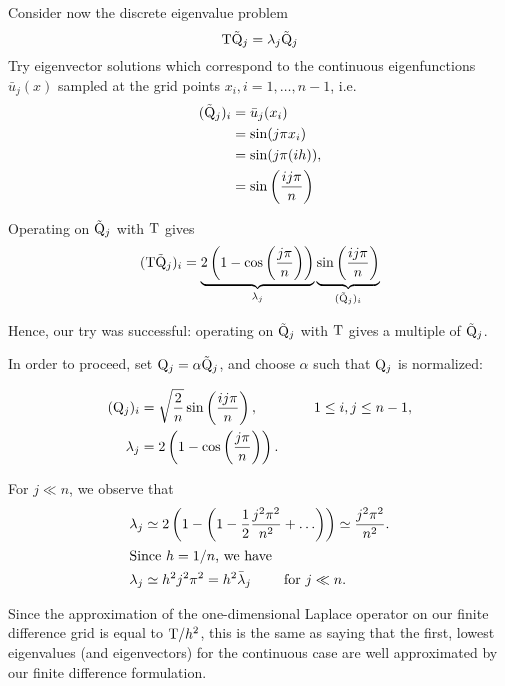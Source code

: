 Consider now the discrete eigenvalue problem
\begin{equation*}
  {\mathrm T} \tilde{{\mathrm Q}}_j =
  \lambda_j \tilde{{\mathrm Q}}_j
\end{equation*}
Try eigenvector solutions which correspond to the continuous eigenfunctions
$\bar{u}_j(x)$ sampled at the grid points $x_i, i=1,\ldots,n-1$, i.e.
\begin{equation*}
  \begin{split}
    (\tilde{{\mathrm Q}}_j)_i &= \bar{u}_j (x_i) \\
    &= \sin(j \pi x_i) \\
    &= \sin(j \pi (i h)), \\
    &= \sin \left(\frac{i j \pi}{n} \right)
  \end{split}
\end{equation*}

Operating on $\tilde{{\mathrm Q}}_j$ with ${\mathrm T}$ gives
\begin{equation*}
  ({\mathrm T} \tilde{{\mathrm Q}}_j)_i =
  \underbrace{2\left( 1 - \cos\left( \frac{j\pi}{n} \right) \right)}_{\lambda_j}
  \underbrace{\sin\left( \frac{i j \pi}{n} \right)}_{(\tilde{{\mathrm Q}}_j)_i}
\end{equation*}

Hence, our try was successful: operating on $\tilde{{\mathrm Q}}_j$ with ${\mathrm T}$ gives
a multiple of $\tilde{{\mathrm Q}}_j$.

In order to proceed, set ${\mathrm Q}_j = \alpha \tilde{{\mathrm Q}}_j$, and choose $\alpha$
such that ${\mathrm Q}_j$ is normalized:

\begin{align*}
  ({\mathrm Q}_j)_i &= \sqrt{\frac{2}{n}} \sin \left( \frac{ij \pi}{n} \right),
                \qquad \qquad 1 \leq i,j \leq n-1, \\
  \lambda_j &= 2 \left( 1 - \cos \left( \frac{j \pi}{n} \right) \right).
\end{align*}

For ${j \ll n}$, we observe that
\begin{align*}
  \lambda_j
  &\simeq 2 \left( 1 - \left( 1 -\frac{1}{2} \frac{j^2 \pi^2}{n^2} + \ldots \right) \right)
    \simeq \frac{j^2 \pi^2}{n^2}. \\
  \intertext{Since $h=1/n$, we have}
  \lambda_j &\simeq h^2j^2 \pi^2 = h^2 \bar{\lambda}_j \qquad \text{ for } j \ll n.
\end{align*}

Since the approximation of the one-dimensional Laplace operator on our finite
difference grid is equal to ${\mathrm T} / h^2$, this is the same as saying that the
first, lowest eigenvalues (and eigenvectors) for the continuous case are well
approximated by our finite difference formulation.

